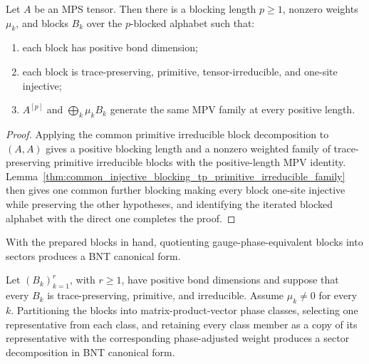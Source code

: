 \begin{lemma}%
    \label{thm:prepared_bnt_blocks_after_blocking}
    \leanok
    Let $A$ be an MPS tensor. Then there is a blocking length $p\ge 1$, nonzero
    weights $\mu_k$, and blocks $B_k$ over the $p$-blocked alphabet such that:
    \begin{enumerate}
        \item each block has positive bond dimension;
        \item each block is trace-preserving, primitive, tensor-irreducible, and
              one-site injective;
        \item $A^{[p]}$ and $\bigoplus_k \mu_k B_k$ generate the same MPV family
              at every positive length.
    \end{enumerate}
\end{lemma}

\begin{proof}\leanok
    Applying the common primitive irreducible block decomposition to $(A,A)$
    gives a positive blocking length and a nonzero weighted family of
    trace-preserving primitive irreducible blocks with the positive-length MPV
    identity. Lemma~\ref{thm:common_injective_blocking_tp_primitive_irreducible_family}
    then gives one common further blocking making every block one-site
    injective while preserving the other hypotheses, and identifying the
    iterated blocked alphabet with the direct one completes the proof.
\end{proof}

With the prepared blocks in hand, quotienting gauge-phase-equivalent blocks
into sectors produces a BNT canonical form.

\begin{lemma}%
    \label{thm:paperbnt_collapsed_prepared}
    \leanok
    Let $(B_k)_{k=1}^r$, with $r\ge1$, have positive bond dimensions and
    suppose that every $B_k$ is trace-preserving, primitive, and irreducible.
    Assume $\mu_k\ne0$ for every $k$. Partitioning the blocks into
    matrix-product-vector phase classes, selecting one
    representative from each class, and retaining every class member as a copy of
    its representative with the corresponding phase-adjusted weight produces a
    sector decomposition in BNT canonical form.
\end{lemma}


